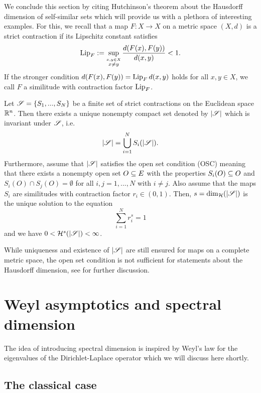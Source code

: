 We conclude this section by citing Hutchinson's theorem about the Hausdorff dimension of self-similar sets which will provide us with a plethora of interesting examples. For this, we recall that a map $F:X\to X$ on a metric space $(X,d)$ is a strict contraction if its Lipschitz constant satisfies
\begin{equation}\label{eq:Lip}
  \operatorname{Lip}_F:=\sup_{\stackrel{x,y\in X}{x\neq y}}\frac{d(F(x),F(y))}{d(x,y)}<1.
\end{equation}
If the stronger condition $d(F(x),F(y))=\operatorname{Lip}_F d(x,y)$ holds for all $x,y\in X$, we call $F$ a similitude with contraction factor $\operatorname{Lip}_F$.
\begin{thm}\label{thm:hutchinson}
  Let $\mathscr{S}=\{S_1,...,S_N\}$ be a finite set of strict contractions on the Euclidean space $\mathbb{R}^n$. Then there exists a unique nonempty compact set denoted by $|\mathscr{S}|$ which is invariant under $\mathscr{S}$, i.e.
  \[
    |\mathscr{S}|=\bigcup_{i=1}^N S_i(|\mathscr{S}|).
  \]
  Furthermore, assume that $|\mathscr{S}|$ satisfies the open set condition (OSC) meaning that there exists a nonempty open set $O\subseteq E$ with the properties $S_i(O)\subseteq O$ and $S_i(O)\cap S_j(O)=\emptyset$ for all $i,j=1,...,N$ with $i\neq j$. Also assume that the maps $S_i$ are similitudes with contraction factor $r_i\in(0,1)$. Then, $s=\dim_{\mathcal{H}}(|\mathscr{S}|)$ is the unique solution to the equation
  \[
    \sum_{i=1}^N r_i^s=1
  \]
  and we have $0<\mathcal{H}^s(|\mathscr{S}|)<\infty$. 
\end{thm}
While uniqueness and existence of $|\mathscr{S}|$ are still ensured for maps on a complete metric space, the open set condition is not sufficient for statements about the Hausdorff dimension, see \cite{schief1996self} for further discussion. 



\section{Weyl asymptotics and spectral dimension}

The idea of introducing spectral dimension is inspired by Weyl's law for the eigenvalues of the Dirichlet-Laplace operator which we will discuss here shortly.

\subsection{The classical case}


